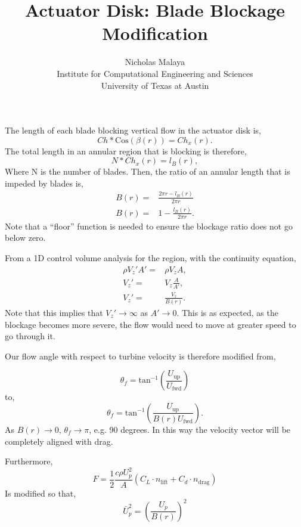 \documentclass{article}
\title{\bf{Actuator Disk: Blade Blockage Modification}}
\author{Nicholas Malaya \\ Institute for Computational Engineering and Sciences \\ University of Texas at Austin} \date{}
\begin{document}
\maketitle

The length of each blade blocking vertical flow in the actuator disk is, 
\begin{equation}
  Ch * \text{Cos}(\beta(r)) = Ch_x(r). 
\end{equation}
The total length in an annular region that is blocking is therefore,
\begin{equation}
  N * Ch_x(r) = l_B(r),
\end{equation}
Where N is the number of blades. 
Then, the ratio of an annular length that is impeded by blades is, 
\begin{eqnarray}
 B(r) =& \frac{2\pi r- l_B(r)}{2 \pi r}\\
 B(r) =& 1- \frac{l_B(r)}{2 \pi r}. 
\end{eqnarray}
Note that a ``floor'' function is needed to ensure the blockage ratio
does not go below zero. 

From a 1D control volume analysis for the region, with the continuity
equation, 
\begin{eqnarray}
 \rho V_z' A' =& \rho V_z A,\\
 V_z' =& V_z \frac{A}{A'}, \\
 V_z' =& \frac{V_z}{B(r)}.
\end{eqnarray}
Note that this implies that $V_z' \rightarrow \infty$ as $A' \rightarrow
0$. This is as expected, as the blockage becomes more severe, the flow
would need to move at greater speed to go through it. 

Our flow angle with respect to turbine velocity is therefore modified
from,

\begin{equation}
 \theta_f = \text{tan}^{-1}(\frac{U_{\text{up}}}{U_{\text{fwd}}})
\end{equation}
to,
\begin{equation}
 \theta_f = \text{tan}^{-1}(\frac{U_{\text{up}}}{B(r) U_{\text{fwd}}}). 
\end{equation}
As $B(r) \rightarrow 0$, $\theta_f \rightarrow \pi$, e.g. 90 degrees. In
this way the velocity vector will be completely aligned with drag. 

Furthermore, 
\begin{equation}
 F = \frac{1}{2}\frac{c \rho U_p^2}{A}(C_L \cdot n_{\text{lift}} + C_d \cdot n_{\text{drag}})
\end{equation}
Is modified so that, 
\begin{equation}
 \bar U_p^{2} = \left(\frac{U_p}{B(r)}\right)^2
\end{equation}
\end{document}
